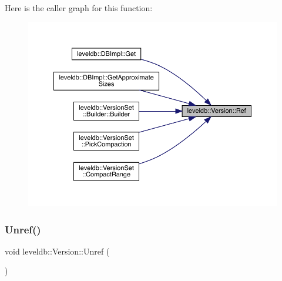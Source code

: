 Here is the caller graph for this function\+:
\nopagebreak
\begin{figure}[H]
\begin{center}
\leavevmode
\includegraphics[width=350pt]{classleveldb_1_1_version_ad237b446c7f7d9e63c4b7c162d6f0064_icgraph}
\end{center}
\end{figure}
\mbox{\label{classleveldb_1_1_version_a3f623697f625d4740d5b273c0bf6223a}} 
\subsubsection{\texorpdfstring{Unref()}{Unref()}}
{\footnotesize\ttfamily void leveldb\+::\+Version\+::\+Unref (\begin{DoxyParamCaption}{ }\end{DoxyParamCaption})}


